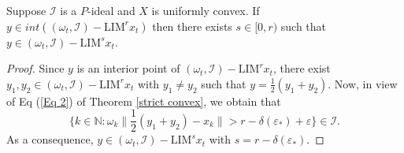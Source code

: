 \documentclass[reqno]{amsart}
\begin{document}
{%
\begin{corollary}\label{Cor 2.2}
	Suppose $\mathcal{I}$ is a $P$-ideal and $X$ is uniformly convex. If $y\in int((\omega_t,\mathcal{I})-\text{LIM}^{r} x_t)$ then there exists $s\in[0,r)$ such that $y\in(\omega_t,\mathcal{I})-\text{LIM}^{s} x_t$. 
\end{corollary}
\begin{proof}
	Since $y$ is an interior point of $(\omega_t,\mathcal{I})-\text{LIM}^{r} x_t$, there exist $y_1,y_2\in (\omega_t,\mathcal{I})-\text{LIM}^{r} x_t$ with $y_1\neq y_2$ such that $y=\frac{1}{2}(y_1+y_2)$. Now, in view of Eq (\ref{Eq 2}) of Theorem \ref{strict convex}, we obtain that
	$$
	\{k\in\mathbb{N}:\omega_k\|\frac{1}{2}(y_1+y_2)-x_{k}\|>r-\delta(\varepsilon_*) +\varepsilon\}\in\mathcal{I}.
	$$
	 As a consequence, $y\in (\omega_t,\mathcal{I})-\text{LIM}^{s} x_t$ with $s=r-\delta(\varepsilon_*)$.
\end{proof}

}
\end{document}
